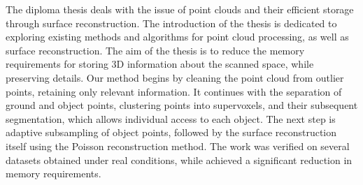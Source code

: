 The diploma thesis deals with the issue of point clouds and their efficient storage through surface reconstruction. The introduction of the thesis is dedicated to exploring existing methods and algorithms for point cloud processing, as well as surface reconstruction. The aim of the thesis is to reduce the memory requirements for storing 3D information about the scanned space, while preserving details. Our method begins by cleaning the point cloud from outlier points, retaining only relevant information. It continues with the separation of ground and object points, clustering points into supervoxels, and their subsequent segmentation, which allows individual access to each object. The next step is adaptive subsampling of object points, followed by the surface reconstruction itself using the Poisson reconstruction method. The work was verified on several datasets obtained under real conditions, while achieved a significant reduction in memory requirements.